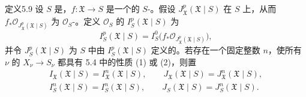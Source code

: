 \begin{SGAresult}{定义}{5.9}
设 $S$ 是，$f:\mathfrak X\to S$ 是一个的 $S$-。假设 $J_{\mathfrak X}^p(\mathfrak X\mid S)$ 在 $S$ 上，从而 $f_*\mathcal O_{J_{\mathfrak X}^p(\mathfrak X\mid S)}$ 为 $\mathcal O_S$-。定义 $\mathcal O_S$ 的 $I_S^p(\mathfrak X\mid S)$ 为
\[
I_S^p(\mathfrak X\mid S)=I_S^0\bigl(f_*\mathcal O_{J_{\mathfrak X}^p(\mathfrak X\mid S)}\bigr),
\]
并令 $J_S^p(\mathfrak X\mid S)$ 为 $S$ 中由 $I_S^p(\mathfrak X\mid S)$ 定义的。若存在一个固定整数 $n$，使所有 $\nu$ 的 $X_\nu\to S_\nu$ 都具有 5.4 中的性质 (1) 或 (2)，则置
\[
\begin{gathered}
I_{\mathfrak X}(\mathfrak X\mid S)=I_{\mathfrak X}^n(\mathfrak X\mid S),
\qquad J_{\mathfrak X}(\mathfrak X\mid S)=J_{\mathfrak X}^n(\mathfrak X\mid S),\\
I_S^n(\mathfrak X\mid S)=I_S^n(\mathfrak X\mid S),
\qquad J_S(\mathfrak X\mid S)=J_S^n(\mathfrak X\mid S).
\end{gathered}
\]
\end{SGAresult}


